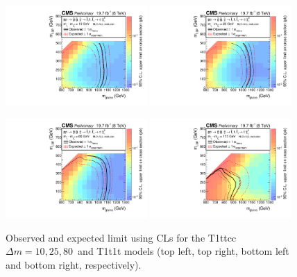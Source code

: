 \begin{figure}[p]
\centering
\includegraphics[width=0.48\textwidth]{figures/razor_interpretation/Boost_T1ttcc_DM10_XSEC}
\includegraphics[width=0.48\textwidth]{figures/razor_interpretation/Boost_T1ttcc_DM25_XSEC}

\includegraphics[width=0.48\textwidth]{figures/razor_interpretation/Boost_T1ttcc_DM80_XSEC}
\includegraphics[width=0.48\textwidth]{figures/razor_interpretation/Boost_T1t1t_XSEC}
\caption{Observed and expected limit using CLs for the T1ttcc $\Delta m=10,25,80$~\GeV and T1t1t
models (top left, top right, bottom left and bottom right, respectively). 
\label{fig:boost_limits}}
\end{figure}

